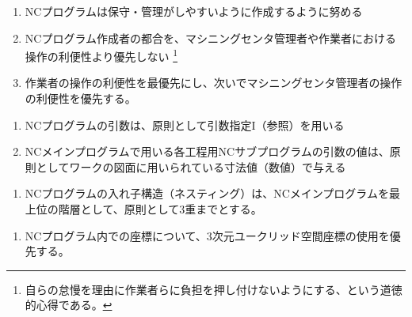 



\begin{NFR}{}
\begin{enumerate}[label=\sarrow]
\item {}NCプログラムは保守・管理がしやすいように作成するように努める
\item {}NCプログラム作成者の都合を、マシニングセンタ管理者や作業者における操作の利便性より優先しない
\footnote{自らの怠慢を理由に作業者らに負担を押し付けないようにする、という道徳的心得である。}
\item 作業者の操作の利便性を最優先にし、次いでマシニングセンタ管理者の操作の利便性を優先する。
\end{enumerate}
\end{NFR}

\begin{NFR}{}
\begin{enumerate}[label=\sarrow]
\item NCプログラムの引数は、原則として引数指定I（参照）を用いる
\item {}NCメインプログラムで用いる各工程用NCサブプログラムの引数の値は、原則としてワークの図面に用いられている寸法値（数値）で与える
\end{enumerate}
\end{NFR}

\begin{NFR}{}
\begin{enumerate}[label=\sarrow]
\item NCプログラムの入れ子構造（ネスティング）は、NCメインプログラムを最上位の階層として、原則として3重までとする。
\end{enumerate}
\end{NFR}

\begin{NFR}{}
\begin{enumerate}[label=\sarrow]
\item NCプログラム内での座標について、3次元ユークリッド空間座標の使用を優先する。
\end{enumerate}
\end{NFR}




